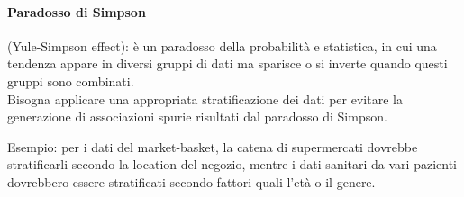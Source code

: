 \paragraph{Paradosso di Simpson} (Yule-Simpson effect): è un paradosso della probabilità e statistica, in cui una tendenza appare in diversi gruppi di dati ma sparisce o si inverte quando questi gruppi sono combinati. \\

Bisogna applicare una appropriata stratificazione dei dati per evitare la generazione di associazioni spurie risultati dal paradosso di Simpson. 

Esempio: per i dati del market-basket, la catena di supermercati dovrebbe stratificarli secondo la location del negozio, mentre i dati sanitari da vari pazienti dovrebbero essere stratificati secondo fattori quali l'età o il genere.